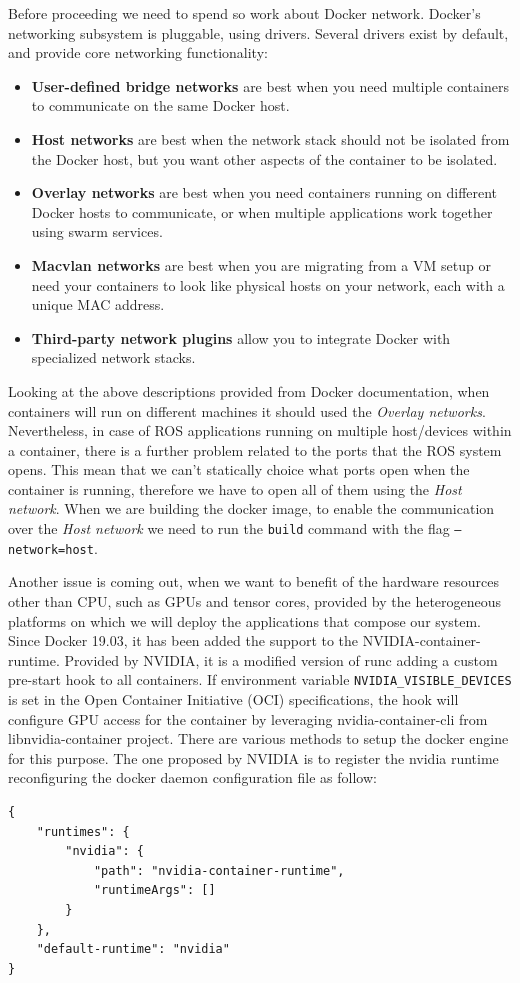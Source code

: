 Before proceeding we need to spend so work about Docker network. Docker’s networking subsystem is pluggable, using drivers. Several drivers exist by default, and provide core networking functionality:
\begin{itemize}
	\item \textbf{User-defined bridge networks} are best when you need multiple containers to communicate on the same Docker host.
	\item \textbf{Host networks} are best when the network stack should not be isolated from the Docker host, but you want other aspects of the container to be isolated.
	\item \textbf{Overlay networks} are best when you need containers running on different Docker hosts to communicate, or when multiple applications work together using swarm services.
	\item \textbf{Macvlan networks} are best when you are migrating from a VM setup or need your containers to look like physical hosts on your network, each with a unique MAC address.
	\item \textbf{Third-party network plugins} allow you to integrate Docker with specialized network stacks.
\end{itemize}
Looking at the above descriptions provided from Docker documentation, when containers will run on different machines it should used the \textit{Overlay networks}. Nevertheless, in case of ROS applications running on multiple host/devices within a container, there is a further problem related to the ports that the ROS system opens. This mean that we can't statically choice what ports open when the container is running, therefore we have to open all of them using the \textit{Host network}.
When we are building the docker image, to enable the communication over the \textit{Host network} we need to run the \texttt{build} command with the flag \texttt{--network=host}.



Another issue is coming out, when we want to benefit of the hardware resources other than CPU, such as GPUs and tensor cores, provided by the heterogeneous platforms on which we will deploy the applications that compose our system.
Since Docker 19.03, it has been added the support to the NVIDIA-container-runtime. Provided by NVIDIA, it is a modified version of runc adding a custom pre-start hook to all containers.
If environment variable \texttt{NVIDIA_VISIBLE_DEVICES} is set in the Open Container Initiative (OCI) specifications, the hook will configure GPU access for the container by leveraging nvidia-container-cli from libnvidia-container project.
There are various methods to setup the docker engine for this purpose. The one proposed by NVIDIA is to register the nvidia runtime reconfiguring the docker daemon configuration file as follow:
\begin{verbatim}
{
	"runtimes": {
		"nvidia": {
			"path": "nvidia-container-runtime",
			"runtimeArgs": []
		}
	},
	"default-runtime": "nvidia"
}
\end{verbatim}

